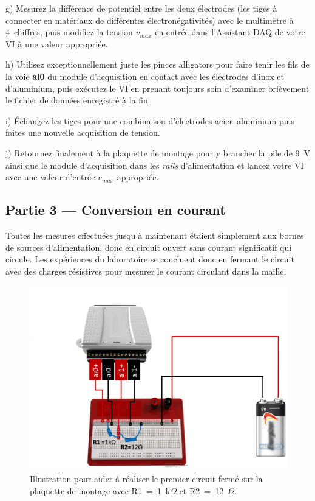 \documentclass[canadien,12pt,oneside,letterpaper]{article}
\begin{document}
g) Mesurez la différence de potentiel entre les deux électrodes (les tiges à connecter en matériaux de différentes électronégativités) avec le multimètre à 4\textonehalf~chiffres, puis modifiez la tension $v_{max}$ en entrée dans l'Assistant DAQ de votre VI à une valeur appropriée.

h) Utilisez exceptionnellement juste les pinces alligators pour faire tenir les fils de la voie \textbf{ai0} du module d'acquisition en contact avec les électrodes d'inox et d'aluminium, puis exécutez le VI en prenant toujours soin d'examiner brièvement le fichier de données enregistré à la fin. 

i) Échangez les tiges pour une combinaison d'électrodes acier--aluminium puis faites une nouvelle acquisition de tension.

j) Retournez finalement à la plaquette de montage pour y brancher la pile de 9~V ainsi que le module d'acquisition dans les \textit{rails} d'alimentation et lancez votre VI avec une valeur d'entrée $v_{max}$ appropriée. 

\subsection{Partie 3 --- Conversion en courant}

Toutes les mesures effectuées jusqu'à maintenant étaient simplement aux bornes de sources d'alimentation, donc en circuit ouvert sans courant significatif qui circule. Les expériences du laboratoire se concluent donc en fermant le circuit avec des charges résistives pour mesurer le courant circulant dans la maille.

\begin{figure}[h]
\centering
\includegraphics[width=1.1\textwidth]{Labo1_Figure1_20250117}
\caption{\label{L01-sch-poweredbreadboard} Illustration pour aider à réaliser le premier circuit fermé sur la plaquette de montage avec R1~=~1~k$\Omega$ et R2~=~12~$\Omega$.}
\end{figure}
\end{document}
